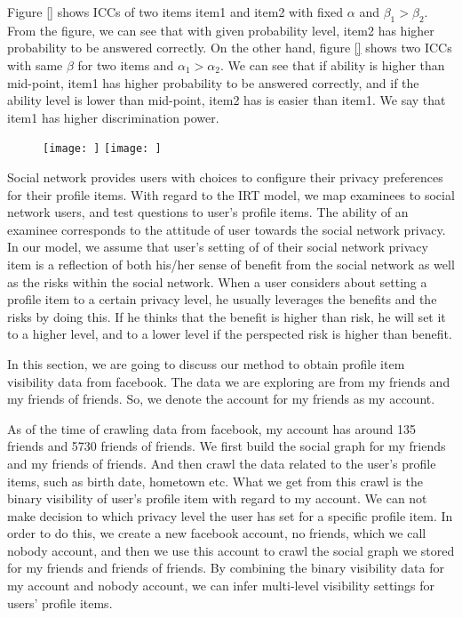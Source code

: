 \documentclass[a4paper]{article}
\begin{document}
Figure \ref{} shows ICCs of two items item1 and item2 with fixed
$\alpha$ and $\beta_1 > \beta_2$. From the figure, we can see that
with given probability level, item2 has higher probability to be
answered correctly. On the other hand, figure \ref{} shows two ICCs
with same $\beta$ for two items and $\alpha_1 > \alpha_2$. We can see
that if ability is higher than mid-point, item1 has higher probability
to be answered correctly, and if the ability level is lower than
mid-point, item2 has is easier than item1. We say that item1 has
higher discrimination power. 

\begin{figure}[h]
  \centering
  \texttt{[image: ]} 
  \texttt{[image: ]} 
\end{figure}

Social network provides users with choices to configure their privacy
preferences for their profile items. With regard to the IRT model, we
map examinees to social network users, and test questions to user's
profile items. The ability of an examinee corresponds to the attitude
of user towards the social network privacy. In our model, we assume
that user's setting of of their social network privacy item is a
reflection of both his/her sense of benefit from the social network
as well as the risks within the social network. When a user considers
about setting a profile item to a certain privacy level, he usually
leverages the benefits and the risks by doing this. If he thinks that
the benefit is higher than risk, he will set it to a higher level, and
to a lower level if the perspected risk is higher than benefit. 



In this section, we are going to discuss our method to obtain profile
item visibility data from facebook. The data we are exploring are from
my friends and my friends of friends. So, we denote the account for my
friends as my account. 

As of the time of crawling data from facebook, my account has around
135 friends and 5730 friends of friends. We first build the social
graph for my friends and my friends of friends. And then crawl the
data related to the user's profile items, such as birth date, hometown
etc. What we get from this crawl is the binary visibility of user's
profile item with regard to my account. We can not make decision to 
which privacy level the user has set for a specific profile item. In
order to do this, we create a new facebook account, no friends, which
we call nobody account, and then we use this account to crawl the
social graph we stored for my friends and friends of friends. By
combining the binary visibility data for my account and nobody
account, we can infer multi-level visibility settings for users'
profile items. 
\end{document}
